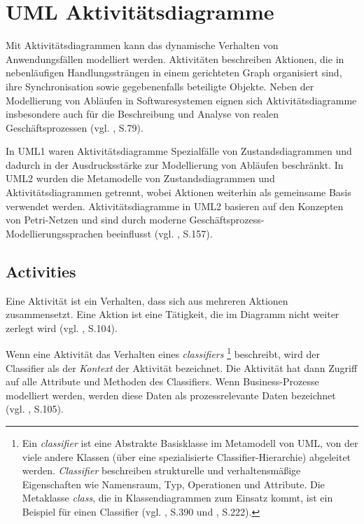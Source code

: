 \section{UML Aktivitätsdiagramme}\label{mod-activity}
Mit Aktivitätsdiagrammen kann das dynamische Verhalten von Anwendungsfällen modelliert werden. Aktivitäten beschreiben Aktionen, die in nebenläufigen Handlungssträngen in einem gerichteten Graph organisiert sind, ihre Synchronisation sowie gegebenenfalls beteiligte Objekte. Neben der Modellierung von Abläufen in Softwaresystemen eignen sich  Aktivitätsdiagramme insbesondere auch für die Beschreibung und Analyse von realen Geschäftsprozessen (vgl. \citep{BernroiderStix2006}, S.79).

In UML1 waren Aktivitätsdiagramme Spezialfälle von Zustandsdiagrammen und dadurch in der Ausdrucksstärke zur Modellierung von Abläufen beschränkt. In UML2 wurden die Metamodelle von Zustandsdiagrammen und Aktivitätsdiagrammen getrennt, wobei Aktionen weiterhin als gemeinsame Basis verwendet werden. Aktivitätsdiagramme in UML2 basieren auf den Konzepten von Petri-Netzen und sind durch moderne Geschäftsprozess-Modellierungssprachen beeinflusst (vgl. \citep{RumbaughJacobsonBooch2005}, S.157).


\subsection{Activities}
Eine Aktivität ist ein Verhalten, dass sich aus mehreren Aktionen zusammensetzt. Eine Aktion ist eine Tätigkeit, die im Diagramm nicht weiter zerlegt wird (vgl. \citep{PilonePitman2005}, S.104).

Wenn eine Aktivität das Verhalten eines \emph{classifiers}
\footnote{Ein \emph{classifier} ist eine Abstrakte Basisklasse im Metamodell von UML, von der viele andere Klassen (über eine spezialisierte Classifier-Hierarchie) abgeleitet werden. \emph{Classifier} beschreiben strukturelle und verhaltensmäßige Eigenschaften wie Namensraum, Typ, Operationen und Attribute. Die Metaklasse \emph{class}, die in Klassendiagrammen zum Einsatz kommt, ist ein Beispiel für einen Classifier (vgl. \citep{HitzEtAl2005}, S.390 und \citep{RumbaughJacobsonBooch2005}, S.222).}
beschreibt, wird der Classifier als der \emph{Kontext} der Aktivität bezeichnet. Die Aktivität hat dann Zugriff auf alle Attribute und Methoden des Classifiers. Wenn Business-Prozesse modelliert werden, werden diese Daten als prozessrelevante Daten bezeichnet (vgl. \citep{PilonePitman2005}, S.105).

